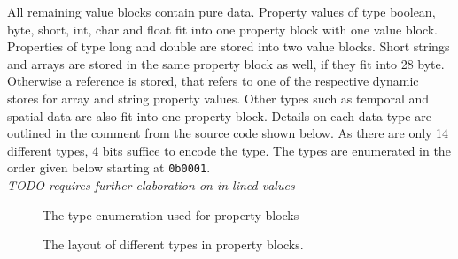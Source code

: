                 All remaining value blocks contain pure data. 
                Property values of type boolean, byte, short, int, char and float fit into one property block with one value block. 
                Properties of type long and double are stored into two value blocks. 
                Short strings and arrays are stored in the same property block as well, if they fit into 28 byte.
                Otherwise a reference is stored, that refers to one of the respective dynamic stores for array and string property values. 
                Other types such as temporal and spatial data are also fit into one property block. 
                Details on each data type are outlined in the comment from the source code shown below. 
                As there are only 14 different types, 4 bits suffice to encode the type. 
                The types are enumerated in the order given below starting at \texttt{0b0001}. \\
                
                \textit{TODO requires further elaboration on in-lined values}
                
                \begin{figure}[htp]\label{property_types}
                    \begin{center}    
                    \end{center}
                    \caption{The type enumeration used for property blocks}
                \end{figure}
                
                \begin{figure}[htp]\label{property_Value_formats}
                    \begin{center}
                    \end{center}
                    \caption{The layout of different types in property blocks.}
                \end{figure}
                
